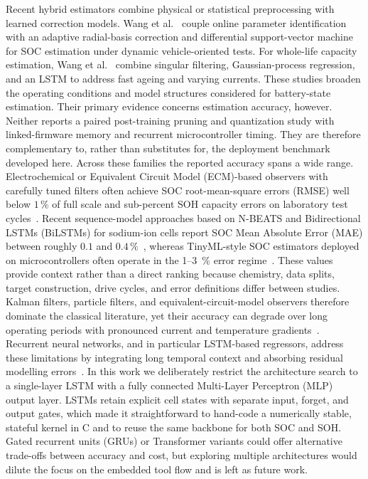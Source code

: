 \documentclass[review]{elsarticle}
\begin{document}
Recent hybrid estimators combine physical or statistical preprocessing with learned correction models. Wang et al.~\cite{wang_improved_2024} couple online parameter identification with an adaptive radial-basis correction and differential support-vector machine for SOC estimation under dynamic vehicle-oriented tests. For whole-life capacity estimation, Wang et al.~\cite{wang_improved_2023} combine singular filtering, Gaussian-process regression, and an LSTM to address fast ageing and varying currents. These studies broaden the operating conditions and model structures considered for battery-state estimation. Their primary evidence concerns estimation accuracy, however. Neither reports a paired post-training pruning and quantization study with linked-firmware memory and recurrent microcontroller timing. They are therefore complementary to, rather than substitutes for, the deployment benchmark developed here.
Across these families the reported accuracy spans a wide range. Electrochemical or Equivalent Circuit Model (ECM)-based observers with carefully tuned filters often achieve SOC root-mean-square errors (RMSE) well below $1\,\%$ of full scale and sub-percent SOH capacity errors on laboratory test cycles~\cite{gaoCoEstimationStateofChargeStateof2022,gaoEnhancedStateofchargeEstimation2022,shenAlternativeCombinedCoestimation2022,wangFusionEstimationLithiumion2022}. Recent sequence-model approaches based on N-BEATS and Bidirectional LSTMs (BiLSTMs) for sodium-ion cells report SOC Mean Absolute Error (MAE) between roughly $0.1$ and $0.4\,\%$~\cite{sunStateChargeEstimation2023,sunStateofchargeEstimationSodiumion2024}, whereas TinyML-style SOC estimators deployed on microcontrollers often operate in the 1--3~\% error regime~\cite{crocioniLiIonBatteriesParameter2020,giazitzisCaseStudyTiny2024,Embedded_AI_only_SOC_mobile}. These values provide context rather than a direct ranking because chemistry, data splits, target construction, drive cycles, and error definitions differ between studies.
Kalman filters, particle filters, and equivalent-circuit-model observers therefore dominate the classical literature, yet their accuracy can degrade over long operating periods with pronounced current and temperature gradients~\cite{gaoEnhancedStateofchargeEstimation2022,wangFusionEstimationLithiumion2022}. Recurrent neural networks, and in particular LSTM-based regressors, address these limitations by integrating long temporal context and absorbing residual modelling errors~\cite{liOnlineCapacityEstimation2021,wangFusionEstimationLithiumion2022}. In this work we deliberately restrict the architecture search to a single-layer LSTM with a fully connected Multi-Layer Perceptron (MLP) output layer. LSTMs retain explicit cell states with separate input, forget, and output gates, which made it straightforward to hand-code a numerically stable, stateful kernel in C and to reuse the same backbone for both SOC and SOH. Gated recurrent units (GRUs) or Transformer variants could offer alternative trade-offs between accuracy and cost, but exploring multiple architectures would dilute the focus on the embedded tool flow and is left as future work.
\end{document}
